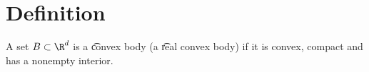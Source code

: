 

\section*{Definition}

A set $B \subset \R ^d$ is a \t{convex body} (a \t{real convex body}) if it is convex, compact and has a nonempty interior.

\blankpage